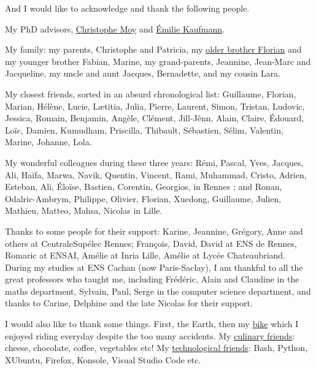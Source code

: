 
\begin{acknowledgements}


And I would like to acknowledge and thank the following people.

My PhD advisors, \href{https://moychristophe.wordpress.com/}{Christophe Moy} and \href{http://chercheurs.lille.inria.fr/ekaufman/research.html}{Émilie Kaufmann}.

My family: my parents, Christophe and Patricia, my \href{https://paris-sorbonne.academia.edu/FBesson}{older brother Florian} and my younger brother Fabian, Marine, my grand-parents, Jeannine, Jean-Marc and Jacqueline, my uncle and aunt Jacques, Bernadette, and my cousin Lara.

My closest friends, sorted in an absurd chronological list: Guillaume, Florian, Marian, Hélène, Lucie, Lætitia, Julia, Pierre, Laurent, Simon, Tristan, Ludovic, Jessica, Romain, Benjamin, Angèle, Clément, Jill-Jênn, Alain, Claire, Édouard, Loïc, Damien, Kumudham, Priscilla, Thibault, Sébastien, Sélim, Valentin, Marine, Johanne, Lola.

My wonderful colleagues during these three years: Rémi, Pascal, Yves, Jacques, Ali, Haïfa, Marwa, Navik, Quentin, Vincent, Rami, Muhammad, Cristo, Adrien, Esteban, Ali, Éloïse, Bastien, Corentin, Georgios, in Rennes ; and Ronan, Odalric-Ambrym, Philippe, Olivier, Florian, Xuedong, Guillaume, Julien, Mathieu, Matteo, Mahsa, Nicolas in Lille.

Thanks to some people for their support: Karine, Jeannine, Grégory, Anne and others at CentraleSupélec Rennes; François, David, David at ENS de Rennes, Romaric at ENSAI, Amélie at Inria Lille, Amélie at Lycée Chateaubriand.
During my studies at ENS Cachan (now Paris-Saclay), I am thankful to all the great professors who taught me, including Frédéric, Alain and Claudine in the maths department, Sylvain, Paul, Serge in the computer science department, and thanks to Carine, Delphine and the late Nicolas for their support.


I would also like to thank some things. First, the Earth, then my \href{https://perso.crans.org/besson/zero-dechet/}{bike} which I enjoyed riding everyday despite the too many accidents.
My \href{https://perso.crans.org/besson/cuisine/}{culinary friends}: cheese, chocolate, coffee, vegetables etc!
My \href{https://perso.crans.org/besson/}{technological friends}: Bash, Python, XUbuntu, Firefox, Konsole, Visual Studio Code etc.



\end{acknowledgements}
